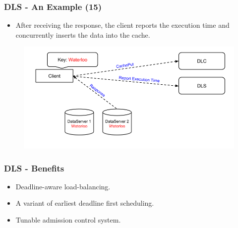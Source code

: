 \documentclass{beamer}
\newcommand{\myv}{\vspace{3 mm}}
\begin{document}
\begin{frame}
  \frametitle{DLS - An Example (15)}
  \begin{itemize}
  \item After receiving the response, the client reports
    the execution time and concurrently inserts the data into the cache.
  \end{itemize}
  \vspace{-0.9 mm}
  \begin{figure}
    \begin{center}
      \centerline{\includegraphics[scale=0.40]{img/DLS_Example09.png}}
    \end{center}
  \end{figure}
\end{frame}

\begin{frame}
  \frametitle{DLS - Benefits}
  \begin{itemize}
  \item Deadline-aware load-balancing.
    \myv
  \item A variant of earliest deadline first scheduling.
    \myv
  \item Tunable admission control system.
  \end{itemize}
\end{frame}
\end{document}

